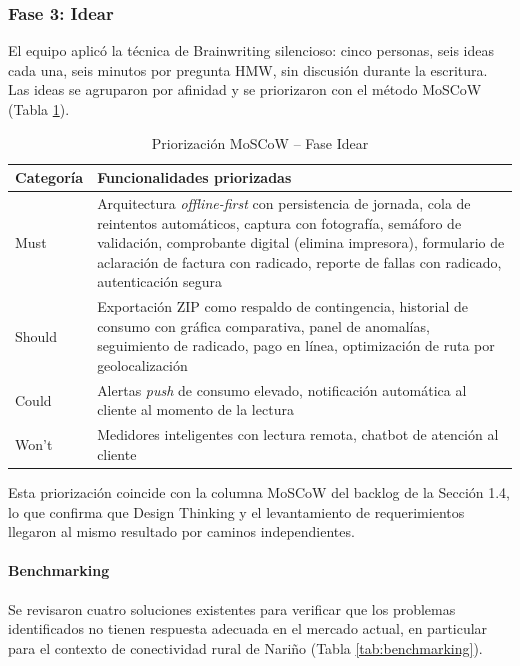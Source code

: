 \documentclass[12pt, a4paper]{article}
\begin{document}
\subsubsection{Fase 3: Idear}

\noindent El equipo aplicó la técnica de Brainwriting silencioso: cinco personas, seis ideas cada una, seis minutos por pregunta HMW, sin discusión durante la escritura. Las ideas se agruparon por afinidad y se priorizaron con el método MoSCoW (Tabla \ref{tab:moscow}).

\begin{table}[H]
  \caption{Priorización MoSCoW -- Fase Idear}
  \label{tab:moscow}
  \centering
  \begin{tabular}{p{2cm} p{12cm}}
    \toprule
    \textbf{Categoría} & \textbf{Funcionalidades priorizadas} \\
    \midrule
    Must & Arquitectura \textit{offline-first} con persistencia de jornada, cola de reintentos automáticos, captura con fotografía, semáforo de validación, comprobante digital (elimina impresora), formulario de aclaración de factura con radicado, reporte de fallas con radicado, autenticación segura \\[4pt]
    Should & Exportación ZIP como respaldo de contingencia, historial de consumo con gráfica comparativa, panel de anomalías, seguimiento de radicado, pago en línea, optimización de ruta por geolocalización \\[4pt]
    Could & Alertas \textit{push} de consumo elevado, notificación automática al cliente al momento de la lectura \\[4pt]
    Won't & Medidores inteligentes con lectura remota, chatbot de atención al cliente \\
    \bottomrule
  \end{tabular}
\end{table}

\noindent Esta priorización coincide con la columna MoSCoW del backlog de la Sección 1.4, lo que confirma que Design Thinking y el levantamiento de requerimientos llegaron al mismo resultado por caminos independientes.

\paragraph{Benchmarking}
Se revisaron cuatro soluciones existentes para verificar que los problemas identificados no tienen respuesta adecuada en el mercado actual, en particular para el contexto de conectividad rural de Nariño (Tabla \ref{tab:benchmarking}).
\end{document}
